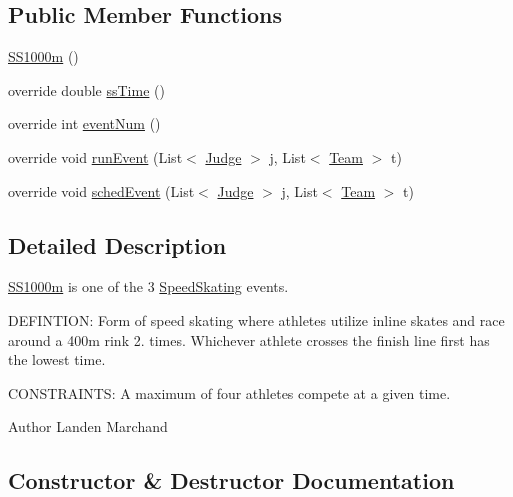 \subsection*{Public Member Functions}
\begin{DoxyCompactItemize}
\item 
\hyperlink{classProject__Codename__Olympia__v1_1_1__0_1_1SS1000m_af0de8059e97b8a3fc6f304d532b6f89b}{S\+S1000m} ()
\item 
override double \hyperlink{classProject__Codename__Olympia__v1_1_1__0_1_1SS1000m_a4bfd83bce70e047370288c0b651e3e1c}{ss\+Time} ()
\item 
override int \hyperlink{classProject__Codename__Olympia__v1_1_1__0_1_1SS1000m_aea0a2bb558a0b5f1ee0cae54a9e12ea9}{event\+Num} ()
\item 
override void \hyperlink{classProject__Codename__Olympia__v1_1_1__0_1_1SS1000m_ab08df1d91a7685c6d1dc9bdec0d45fba}{run\+Event} (List$<$ \hyperlink{classProject__Codename__Olympia__v1_1_1__0_1_1Judge}{Judge} $>$ j, List$<$ \hyperlink{classProject__Codename__Olympia__v1_1_1__0_1_1Team}{Team} $>$ t)
\item 
override void \hyperlink{classProject__Codename__Olympia__v1_1_1__0_1_1SS1000m_a4cb7d76aed8d478577e243b187ce4830}{sched\+Event} (List$<$ \hyperlink{classProject__Codename__Olympia__v1_1_1__0_1_1Judge}{Judge} $>$ j, List$<$ \hyperlink{classProject__Codename__Olympia__v1_1_1__0_1_1Team}{Team} $>$ t)
\end{DoxyCompactItemize}


\subsection{Detailed Description}
\hyperlink{classProject__Codename__Olympia__v1_1_1__0_1_1SS1000m}{S\+S1000m} is one of the 3 \hyperlink{classProject__Codename__Olympia__v1_1_1__0_1_1SpeedSkating}{Speed\+Skating} events. 

D\+E\+F\+I\+N\+T\+I\+ON\+: Form of speed skating where athletes utilize inline skates and race around a 400m rink 2. times. Whichever athlete crosses the finish line first has the lowest time.

C\+O\+N\+S\+T\+R\+A\+I\+N\+TS\+: A maximum of four athletes compete at a given time.\begin{DoxyAuthor}{Author}
Landen Marchand 
\end{DoxyAuthor}


\subsection{Constructor \& Destructor Documentation}
\mbox{\label{classProject__Codename__Olympia__v1_1_1__0_1_1SS1000m_af0de8059e97b8a3fc6f304d532b6f89b}} 
